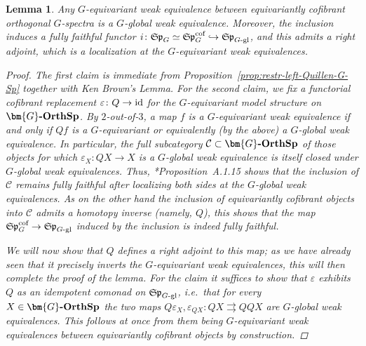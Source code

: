 \documentclass[reqno]{memo-l}
\theoremstyle{mythm}
\newtheorem{lemma}[thm]{Lemma}
\theoremstyle{definition}
\numberwithin{equation}{section}
\newcommand{\Cc}{{\mathcal{C}}}
\renewcommand{\epsilon}{\varepsilon}
\newcommand{\cat}[1]{\textbf{\textup{#1}}}
\newcommand{\id}{\textup{id}}
\newcommand{\mySp}{{\mathfrak S\kern-.5pt\mathfrak p}}
\newcommand{\Gosp}[1]{\cat{$\bm{#1}$-OrthSp}}
\begin{document}
\begin{lemma}\label{lemma:equiv-spectra-vs-gl-spectra}
    Any $G$-equivariant weak equivalence between equivariantly cofibrant orthogonal $G$-spectra is a $G$-global weak equivalence. Moreover, the inclusion induces a fully faithful functor $i\colon\mySp_G\simeq\mySp_G^\textup{cof}\hookrightarrow\mySp_\textup{$G$-gl}$, and this admits a right adjoint, which is a localization at the $G$-equivariant weak equivalences.
    \begin{proof}
        The first claim is immediate from Proposition~\ref{prop:restr-left-Quillen-G-Sp} together with Ken Brown's Lemma. 
        For the second claim, we fix a functorial cofibrant replacement $\epsilon\colon Q\to\id$ for the $G$-equivariant model structure on $\Gosp{G}$. By $2$-out-of-$3$, a map $f$ is a $G$-equivariant weak equivalence if and only if $Qf$ is a $G$-equivariant or equivalently (by the above) a $G$-global weak equivalence. In particular, the full subcategory $\Cc\subset\Gosp{G}$ of those objects for which $\epsilon_X\colon QX\to X$ is a \emph{$G$-global} weak equivalence is itself closed under $G$-global weak equivalences. Thus, \cite{g-global}*{Proposition~A.1.15} shows that the inclusion of $\Cc$ remains fully faithful after localizing both sides at the $G$-global weak equivalences. As on the other hand the inclusion of equivariantly cofibrant objects into $\Cc$ admits a homotopy inverse (namely, $Q$), this shows that the map $\mySp_G^\textup{cof}\to\mySp_\text{$G$-gl}$ induced by the inclusion is indeed fully faithful.

        We will now show that $Q$ defines a right adjoint to this map; as we have already seen that it precisely inverts the $G$-equivariant weak equivalences, this will then complete the proof of the lemma. For the claim it suffices to show that $\epsilon$ exhibits $Q$ as an idempotent comonad on $\mySp_\text{$G$-gl}$, i.e.\ that for every $X\in\Gosp{G}$ the two maps $Q\epsilon_X,\epsilon_{QX}\colon QX\rightrightarrows QQX$ are $G$-global weak equivalences. This follows at once from them being \emph{$G$-equivariant} weak equivalences between equivariantly cofibrant objects by construction.
    \end{proof}
\end{lemma}
\end{document}
